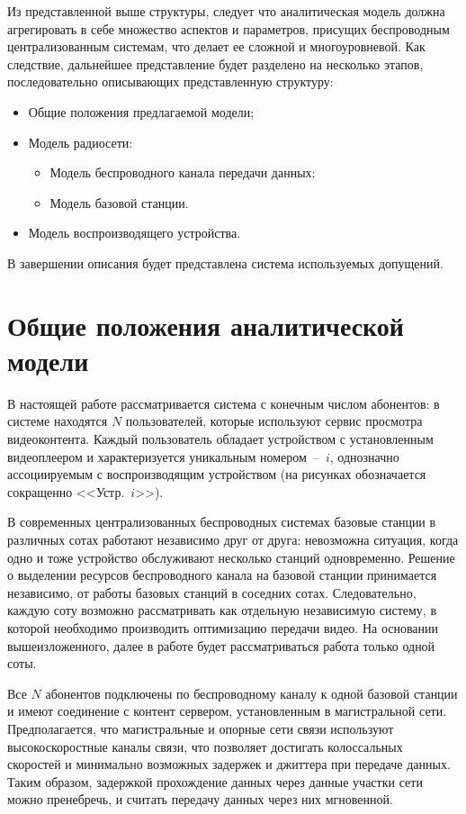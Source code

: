 Из представленной выше структуры, следует что аналитическая модель должна агрегировать в себе множество аспектов и параметров, присущих беспроводным централизованным системам, что делает ее сложной и многоуровневой. Как следствие, дальнейшее представление будет разделено на несколько этапов, последовательно описывающих представленную структуру:
\begin{itemize}
  \item Общие положения предлагаемой модели;
  \item Модель радиосети:
  \begin{itemize}
  	\item Модель беспроводного канала передачи данных;
  	\item Модель базовой станции.
  \end{itemize}
  \item Модель воспроизводящего устройства.
\end{itemize}
В завершении описания будет представлена система используемых допущений.

\section{Общие положения аналитической модели}
\label{chap2:GeneralOverview}

В настоящей работе рассматривается система с конечным числом абонентов: в системе находятся $N$ пользователей, которые используют сервис просмотра видеоконтента. Каждый пользователь обладает устройством с установленным видеоплеером и характеризуется уникальным номером~--~$i$, однозначно ассоциируемым с воспроизводящим устройством (на рисунках обозначается сокращенно <<Устр.~$i$>>).

В современных централизованных беспроводных системах базовые станции в различных сотах работают независимо друг от друга: невозможна ситуация, когда одно и тоже устройство обслуживают несколько станций одновременно. Решение о выделении ресурсов беспроводного канала на базовой станции принимается независимо, от работы базовых станций в соседних сотах. Следовательно, каждую соту возможно рассматривать как отдельную независимую систему, в которой необходимо производить оптимизацию передачи видео. На основании вышеизложенного, далее в работе будет рассматриваться работа только одной соты.

Все $N$ абонентов подключены по беспроводному каналу к одной базовой станции и имеют соединение с контент сервером, установленным в магистральной сети. Предполагается, что магистральные и опорные сети связи используют высокоскоростные каналы связи, что позволяет достигать колоссальных скоростей и минимально возможных задержек и джиттера при передаче данных. Таким образом, задержкой прохождение данных через данные участки сети можно пренебречь, и считать передачу данных через них мгновенной.

